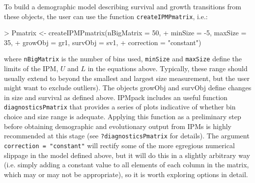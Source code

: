 \documentclass{article}
\begin{document}
To build a demographic model describing survival and growth transitions from these objects, the user can use the function {\tt createIPMPmatrix}, i.e.: 
\begin{Schunk}
\begin{Sinput}
> Pmatrix <- createIPMPmatrix(nBigMatrix = 50, 
+                             minSize = -5, maxSize = 35, 
+                             growObj = gr1, survObj = sv1, 
+                             correction = "constant")
\end{Sinput}
\end{Schunk}
where {\tt nBigMatrix} is the number of bins used, {\tt minSize} and
{\tt maxSize} define the limits of the IPM, $U$ and $L$ in the
equations above. Typically, these range
should usually extend to beyond the smallest and largest size
measurement, but the user might want to exclude outliers). The objects
growObj and survObj define changes in size and survival as defined
above. IPMpack includes an useful function {\tt diagnosticsPmatrix}
that provides a series of plots indicative of whether bin choice and
size range is adequate. Applying this function as a preliminary step
before obtaining demographic and evolutionary output from IPMs is
highly recommended at this stage (see {\tt ?diagnosticsPmatrix} for
details). The argument {\tt correction = "constant"} will rectify some
of the more egregious numerical slippage in the model defined above,
but it will do this in a slightly arbitrary way (i.e. simply adding a
constant value to all elements of each column in the matrix, which may
or may not be appropriate), so it is worth exploring options in detail.
\end{document}
